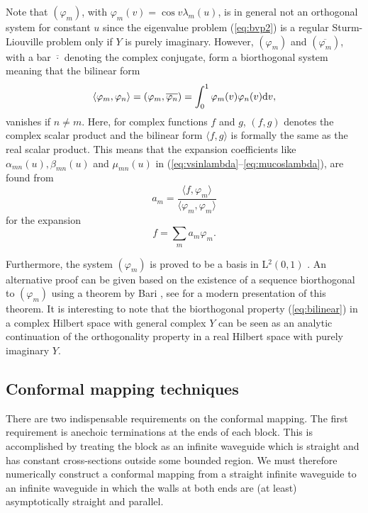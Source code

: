 \documentclass[numreferences]{kluwer}
\begin{document}
Note that $(\varphi_m)$, with $\varphi_m(v)=\cos v\lambda_m(u)$, is in
general not an orthogonal system for constant $u$ since the eigenvalue
problem (\ref{eq:bvp2}) is a regular Sturm-Liouville problem only if
$Y$ is purely imaginary. However, $(\varphi_m)$ and
$(\overline{\varphi_m})$, with a bar $\overline{\cdot}$ denoting the
complex conjugate, form a biorthogonal system meaning that the
bilinear form
\begin{equation}\label{eq:bilinear}
  \langle \varphi_m,\varphi_n\rangle
  =(\varphi_m,\overline{\varphi_n})
  =\int_0^1\varphi_m(v)\varphi_n(v){\rm d}v,
\end{equation}
vanishes if $n\neq m$. Here, for complex functions $f$ and $g$,
$(f,g)$ denotes the complex scalar product and the bilinear form
$\langle f,g \rangle$ is formally the same as the real scalar
product. This means that the expansion coefficients like
$\alpha_{mn}(u),\beta_{mn}(u)$ and $\mu_{mn}(u)$ in
(\ref{eq:vsinlambda}--\ref{eq:mucoslambda}), are found from
\begin{equation}\label{eq:am}
  a_m=\frac{\langle f,\varphi_m \rangle}{\langle \varphi_m,\varphi_m \rangle}
\end{equation}
for the expansion
\begin{equation}\label{eq:expansion}
  f=\sum_m a_m \varphi_m.
\end{equation}

Furthermore, the system $(\varphi_m)$ is proved to be a basis in
L$^2(0,1)$ \cite{Schwartz:1954}. An alternative proof can be given
based on the existence of a sequence biorthogonal to $(\varphi_m)$
using a theorem by Bari \cite{Bari:1944}, see \cite{Christensson:2003}
for a modern presentation of this theorem. It is interesting to note
that the biorthogonal property (\ref{eq:bilinear}) in a complex
Hilbert space with general complex $Y$ can be seen as an analytic
continuation of the orthogonality property in a real Hilbert space
with purely imaginary $Y$.

\subsection{Conformal mapping techniques}
\label{sec:confmap}

There are two indispensable requirements on the conformal mapping. The
first requirement is anechoic terminations at the ends of each
block. This is accomplished by treating the block as an infinite
waveguide which is straight and has constant cross-sections outside
some bounded region. We must therefore numerically construct a
conformal mapping from a straight infinite waveguide to an infinite
waveguide in which the walls at both ends are (at least)
asymptotically straight and parallel.
\end{document}
